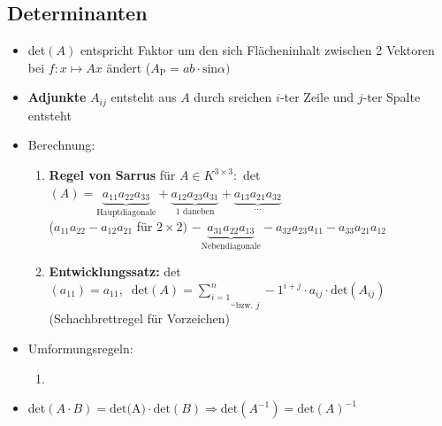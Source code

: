 \documentclass[10pt,a4paper]{article}
\begin{document}
\newpage
\subsection{Determinanten}
\begin{itemize}
\item det$(A)$ entspricht Faktor um den sich Flächeninhalt zwischen 2 Vektoren bei $f: x\mapsto Ax$ ändert ($A_{\text{P}}=ab\cdot \text{sin}\alpha)$ 


\item \textbf{Adjunkte} $A_{ij}$ entsteht aus $A$ durch sreichen $i$-ter Zeile und $j$-ter Spalte entsteht
\item Berechnung:
\begin{enumerate}
\item \textbf{Regel von Sarrus} für $A\in K^{3\times 3}:$ det$(A)=\underbrace{a_{11}a_{22}a_{33}}_{\text{Hauptdiagonale}}+\underbrace{a_{12}a_{23}a_{31}}_{\text{1 daneben}}+\underbrace{a_{13}a_{21}a_{32}}_{\dotsc}$\\
($a_{11}a_{22}-a_{12}a_{21}$ für $2\times 2)$
\hspace{2cm} $-\underbrace{a_{31}a_{22}a_{13}}_{\text{Nebendiagonale}}-a_{32}a_{23}a_{11}-a_{33}a_{21}a_{12}$
\item \textbf{Entwicklungssatz:} det$(a_{11})=a_{11}, \;\; \text{det}(A)=\underbrace{\sum_{i=1}^{n}}_{\text{bzw. }j}-1^{i+j}\cdot a_{ij}\cdot \text{det}(A_{ij})\;$ (Schachbrettregel für Vorzeichen)
\end{enumerate}
\item Umformungsregeln:
\begin{enumerate}
\item
\end{enumerate}
\item det$(A\cdot B)=\text{det(A)}\cdot \text{det}(B) \Rightarrow \text{det}(A^{-1})=\text{det}(A)^{-1}$
\end{itemize}
\end{document}
